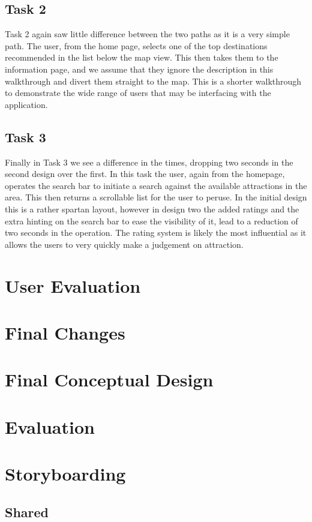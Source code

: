 \documentclass{article}
\begin{document}
\subsection{Task 2}
Task 2 again saw little difference between the two paths as it is a very simple path.
The user, from the home page, selects one of the top destinations recommended in the list below the map view.
This then takes them to the information page, and we assume that they ignore the description in this walkthrough and divert them straight to the map.
This is a shorter walkthrough to demonstrate the wide range of users that may be interfacing with the application.
\subsection{Task 3}
Finally in Task 3 we see a difference in the times, dropping two seconds in the second design over the first.
In this task the user, again from the homepage, operates the search bar to initiate a search against the available attractions in the area.
This then returns a scrollable list for the user to peruse.
In the initial design this is a rather spartan layout, however in design two the added ratings and the extra hinting on the search bar to ease the visibility of it, lead to a reduction of two seconds in the operation.
The rating system is likely the most influential as it allows the users to very quickly make a judgement on attraction.
\section{User Evaluation}
\section{Final Changes}
\section{Final Conceptual Design}
\section{Evaluation}
\section{Storyboarding}
\subsection{Shared}
\end{document}

